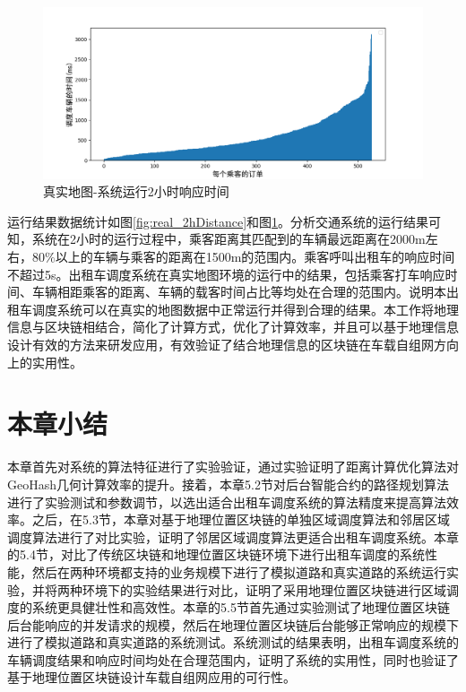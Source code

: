 \begin{figure}[h]
  \centering
  \includegraphics[width=1.0\textwidth]{figures/real_2hTime}
  \caption{真实地图-系统运行2小时响应时间}\label{fig:real_2hTime}
\end{figure}

运行结果数据统计如图\ref{fig:real_2hDistance}和图\ref{fig:real_2hTime}。分析交通系统的运行结果可知，系统在2小时的运行过程中，乘客距离其匹配到的车辆最远距离在2000m左右，80$\%$以上的车辆与乘客的距离在1500m的范围内。乘客呼叫出租车的响应时间不超过5s。出租车调度系统在真实地图环境的运行中的结果，包括乘客打车响应时间、车辆相距乘客的距离、车辆的载客时间占比等均处在合理的范围内。说明本出租车调度系统可以在真实的地图数据中正常运行并得到合理的结果。本工作将地理信息与区块链相结合，简化了计算方式，优化了计算效率，并且可以基于地理信息设计有效的方法来研发应用，有效验证了结合地理信息的区块链在车载自组网方向上的实用性。

\section{本章小结}
本章首先对系统的算法特征进行了实验验证，通过实验证明了距离计算优化算法对GeoHash几何计算效率的提升。接着，本章5.2节对后台智能合约的路径规划算法进行了实验测试和参数调节，以选出适合出租车调度系统的算法精度来提高算法效率。之后，在5.3节，本章对基于地理位置区块链的单独区域调度算法和邻居区域调度算法进行了对比实验，证明了邻居区域调度算法更适合出租车调度系统。本章的5.4节，对比了传统区块链和地理位置区块链环境下进行出租车调度的系统性能，然后在两种环境都支持的业务规模下进行了模拟道路和真实道路的系统运行实验，并将两种环境下的实验结果进行对比，证明了采用地理位置区块链进行区域调度的系统更具健壮性和高效性。本章的5.5节首先通过实验测试了地理位置区块链后台能响应的并发请求的规模，然后在地理位置区块链后台能够正常响应的规模下进行了模拟道路和真实道路的系统测试。系统测试的结果表明，出租车调度系统的车辆调度结果和响应时间均处在合理范围内，证明了系统的实用性，同时也验证了基于地理位置区块链设计车载自组网应用的可行性。

